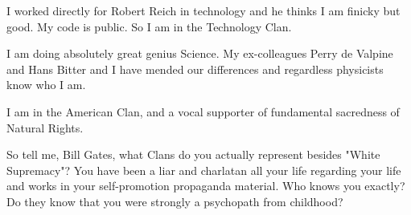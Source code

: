 \documentclass{amsart}
\begin{document}
I worked directly for Robert Reich in technology and he thinks I am finicky but good.  My code is public.  So I am in the Technology Clan.

I am doing absolutely great genius Science.  My ex-colleagues Perry de Valpine and Hans Bitter and I have mended our differences and regardless physicists know who I am.

I am in the American Clan, and a vocal supporter of fundamental sacredness of Natural Rights.

So tell me, Bill Gates, what Clans do you actually represent besides "White Supremacy"?  You have been a liar and charlatan all your life regarding your life and works in your self-promotion propaganda material.  Who knows you exactly?  Do they know that you were strongly a psychopath from childhood?
\end{document}
